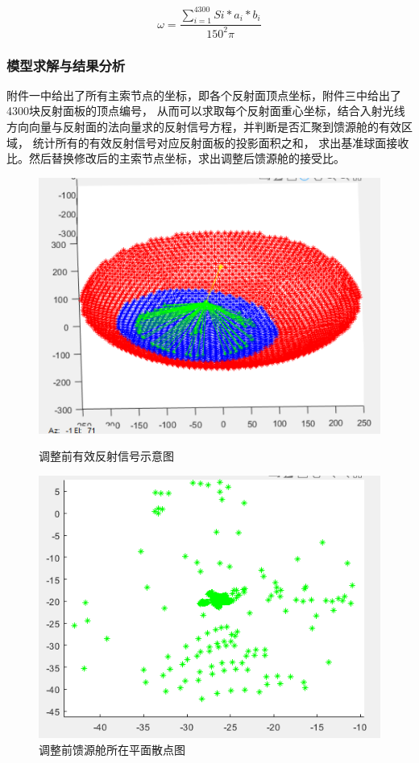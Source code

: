 \documentclass[withoutpreface,bwprint]{cumcmthesis} %
\begin{document}
\begin{equation}
    \omega = \frac{\sum_{i=1}^{4300}Si*a_i*b_i}{150^2\pi}
\end{equation}


\subsubsection{模型求解与结果分析}

附件一中给出了所有主索节点的坐标，即各个反射面顶点坐标，附件三中给出了4300块反射面板的顶点编号，
从而可以求取每个反射面重心坐标，结合入射光线方向向量与反射面的法向量求的反射信号方程，并判断是否汇聚到馈源舱的有效区域，
统计所有的有效反射信号对应反射面板的投影面积之和，
求出基准球面接收比。然后替换修改后的主索节点坐标，求出调整后馈源舱的接受比。

\begin{figure}[H]
    \begin{minipage}[t]{0.5\linewidth}
    \centering
    \includegraphics[scale=0.35]{images/jieguo1.png}
    \caption{调整前有效反射信号示意图}
    \label{fig:side:a}
    \end{minipage}%
    \begin{minipage}[t]{0.5\linewidth}
    \centering
    \includegraphics[scale=0.45]{images/xinjieguo1.png}
    \caption{调整前馈源舱所在平面散点图}
    \label{fig:side:b}
    \end{minipage}
\end{figure}
\end{document}
